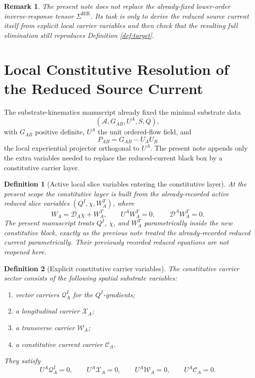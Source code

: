 \documentclass[11pt]{article}
\newcommand{\Sub}{\mathcal{A}}
\newcommand{\ProjSub}{P}
\newcommand{\SpatialD}{\mathcal D}
\newcommand{\ConstCurrent}{\mathcal C}
\newcommand{\QCarrier}{\mathcal Q}
\newcommand{\ChiCarrier}{\mathcal X}
\newcommand{\TransCarrier}{\mathcal W}
\newcommand{\SigmaIER}{\Sigma^{\mathrm{IER}}}
\newtheorem{definition}{Definition}
\newtheorem{remark}{Remark}
\begin{document}
\begin{remark}
The present note does not replace the already-fixed lower-order inverse-response tensor \(\SigmaIER\). Its task is only to derive the reduced source current itself from explicit local carrier variables and then check that the resulting full elimination still reproduces Definition \ref{def:target}.
\end{remark}

\section{Local Constitutive Resolution of the Reduced Source Current}

The substrate-kinematics manuscript already fixed the minimal substrate data
\[
(\Sub,G_{AB},U^A,S,Q),
\]
with \(G_{AB}\) positive definite, \(U^A\) the unit ordered-flow field, and
\begin{equation}
\ProjSub_{AB}=G_{AB}-U_AU_B
\label{eq:projector}
\end{equation}
the local experiential projector orthogonal to \(U^A\). The present note appends only the extra variables needed to replace the reduced-current black box by a constitutive carrier layer.

\begin{definition}[Active local slice variables entering the constitutive layer]
\label{def:activeslice}
At the present scope the constitutive layer is built from the already-recorded active reduced slice variables \((Q^I,\chi,W_A^T)\), where
\begin{equation}
W_A=\SpatialD_A\chi+W_A^T,
\qquad
U^AW_A^T=0,
\qquad
\SpatialD^AW_A^T=0.
\label{eq:Wdecomp}
\end{equation}
The present manuscript treats \(Q^I\), \(\chi\), and \(W_A^T\) parametrically inside the new constitutive block, exactly as the previous note treated the already-recorded reduced current parametrically. Their previously recorded reduced equations are not reopened here.
\end{definition}

\begin{definition}[Explicit constitutive carrier variables]
\label{def:carriers}
The \emph{constitutive carrier sector} consists of the following spatial substrate variables:
\begin{enumerate}
    \item vector carriers \(\QCarrier^I_A\) for the \(Q^I\)-gradients;
    \item a longitudinal carrier \(\ChiCarrier_A\);
    \item a transverse carrier \(\TransCarrier_A\);
    \item a constitutive current carrier \(\ConstCurrent_A\).
\end{enumerate}
They satisfy
\begin{equation}
U^A\QCarrier^I_A=0,
\qquad
U^A\ChiCarrier_A=0,
\qquad
U^A\TransCarrier_A=0,
\qquad
U^A\ConstCurrent_A=0.
\label{eq:carrierspatial}
\end{equation}
\end{definition}
\end{document}
